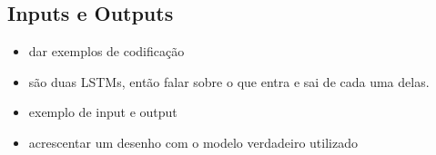 \subsection{Inputs e Outputs}
\begin{itemize}
    \item dar exemplos de codificação
    \item são duas LSTMs, então falar sobre o que entra e sai de cada uma delas.
    \item exemplo de input e output
    \item acrescentar um desenho com o modelo verdadeiro utilizado
\end{itemize}



